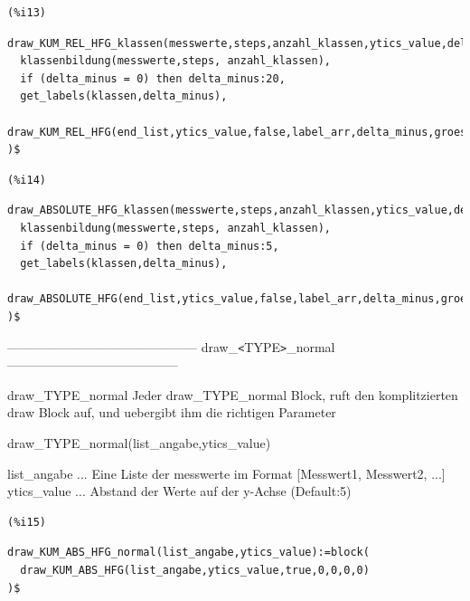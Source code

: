 \documentclass[12pt]{article}
\begin{document}
\noindent
\begin{minipage}[t]{8ex}{\color{red}\bf
\begin{verbatim}
(%i13) 
\end{verbatim}}
\end{minipage}
\begin{minipage}[t]{\textwidth}{\color{blue}
\begin{verbatim}
draw_KUM_REL_HFG_klassen(messwerte,steps,anzahl_klassen,ytics_value,delta_minus,groesse1,groesse2):=block(
  klassenbildung(messwerte,steps, anzahl_klassen),
  if (delta_minus = 0) then delta_minus:20,
  get_labels(klassen,delta_minus),
  draw_KUM_REL_HFG(end_list,ytics_value,false,label_arr,delta_minus,groesse1,groesse2)
)$
\end{verbatim}}
\end{minipage}


\noindent
\begin{minipage}[t]{8ex}{\color{red}\bf
\begin{verbatim}
(%i14) 
\end{verbatim}}
\end{minipage}
\begin{minipage}[t]{\textwidth}{\color{blue}
\begin{verbatim}
draw_ABSOLUTE_HFG_klassen(messwerte,steps,anzahl_klassen,ytics_value,delta_minus,groesse1,groesse2):=block(
  klassenbildung(messwerte,steps, anzahl_klassen),
  if (delta_minus = 0) then delta_minus:5,
  get_labels(klassen,delta_minus),
  draw_ABSOLUTE_HFG(end_list,ytics_value,false,label_arr,delta_minus,groesse1,groesse2)
)$
\end{verbatim}}
\end{minipage}

--------------------------------------------- draw\_\verb|<|TYPE\verb|>|\_normal -----------------------------------------

draw\_TYPE\_normal
    Jeder draw\_TYPE\_normal Block, ruft den komplitzierten draw Block auf, und uebergibt ihm die richtigen Parameter


draw\_TYPE\_normal(list\_angabe,ytics\_value)

list\_angabe       ... Eine Liste der messwerte im Format [Messwert1, Messwert2, ...]
ytics\_value     ... Abstand der Werte auf der y-Achse (Default:5)

\noindent
\begin{minipage}[t]{8ex}{\color{red}\bf
\begin{verbatim}
(%i15) 
\end{verbatim}}
\end{minipage}
\begin{minipage}[t]{\textwidth}{\color{blue}
\begin{verbatim}
draw_KUM_ABS_HFG_normal(list_angabe,ytics_value):=block(
  draw_KUM_ABS_HFG(list_angabe,ytics_value,true,0,0,0,0)
)$
\end{verbatim}}
\end{minipage}
\end{document}

